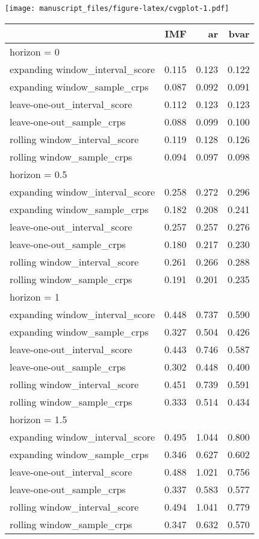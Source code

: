 \documentclass[
]{article}
\begin{document}
\texttt{[image: manuscript\_files/figure-latex/cvgplot-1.pdf]}

\newpage
\begin{longtable}{l|rrr}
\toprule
\multicolumn{1}{l}{} & IMF & ar & bvar \\ 
\midrule
\multicolumn{4}{l}{horizon = 0} \\ 
\midrule
expanding window\_interval\_score & 0.115 & 0.123 & 0.122 \\ 
expanding window\_sample\_crps & 0.087 & 0.092 & 0.091 \\ 
leave-one-out\_interval\_score & 0.112 & 0.123 & 0.123 \\ 
leave-one-out\_sample\_crps & 0.088 & 0.099 & 0.100 \\ 
rolling window\_interval\_score & 0.119 & 0.128 & 0.126 \\ 
rolling window\_sample\_crps & 0.094 & 0.097 & 0.098 \\ 
\midrule
\multicolumn{4}{l}{horizon = 0.5} \\ 
\midrule
expanding window\_interval\_score & 0.258 & 0.272 & 0.296 \\ 
expanding window\_sample\_crps & 0.182 & 0.208 & 0.241 \\ 
leave-one-out\_interval\_score & 0.257 & 0.257 & 0.276 \\ 
leave-one-out\_sample\_crps & 0.180 & 0.217 & 0.230 \\ 
rolling window\_interval\_score & 0.261 & 0.266 & 0.288 \\ 
rolling window\_sample\_crps & 0.191 & 0.201 & 0.235 \\ 
\midrule
\multicolumn{4}{l}{horizon = 1} \\ 
\midrule
expanding window\_interval\_score & 0.448 & 0.737 & 0.590 \\ 
expanding window\_sample\_crps & 0.327 & 0.504 & 0.426 \\ 
leave-one-out\_interval\_score & 0.443 & 0.746 & 0.587 \\ 
leave-one-out\_sample\_crps & 0.302 & 0.448 & 0.400 \\ 
rolling window\_interval\_score & 0.451 & 0.739 & 0.591 \\ 
rolling window\_sample\_crps & 0.333 & 0.514 & 0.434 \\ 
\midrule
\multicolumn{4}{l}{horizon = 1.5} \\ 
\midrule
expanding window\_interval\_score & 0.495 & 1.044 & 0.800 \\ 
expanding window\_sample\_crps & 0.346 & 0.627 & 0.602 \\ 
leave-one-out\_interval\_score & 0.488 & 1.021 & 0.756 \\ 
leave-one-out\_sample\_crps & 0.337 & 0.583 & 0.577 \\ 
rolling window\_interval\_score & 0.494 & 1.041 & 0.779 \\ 
rolling window\_sample\_crps & 0.347 & 0.632 & 0.570 \\ 
\bottomrule
\end{longtable}
\end{document}
